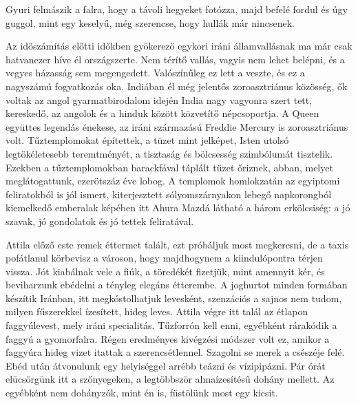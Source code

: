 
Gyuri felmászik a falra, hogy a távoli hegyeket fotózza, majd befelé
fordul és úgy guggol, mint egy keselyű, még szerencse, hogy hullák
már nincsenek.

Az időszámítás előtti időkben gyökerező egykori iráni államvallásnak
ma már csak hatvanezer híve él országszerte. Nem térítő vallás,
vagyis nem lehet belépni, és a vegyes házasság sem megengedett. Valószínűleg
ez lett a veszte, és ez a nagyszámú fogyatkozás oka. Indiában
él még jelentős zoroasztriánus közösség, ők voltak az angol gyarmatbirodalom
idején India nagy vagyonra szert tett, kereskedő, az angolok
és a hinduk között közvetítő népcsoportja. A Queen együttes legendás
énekese, az iráni származású Freddie Mercury is zoroasztriánus
volt. Tűztemplomokat építettek, a tüzet mint jelképet, Isten utolsó
legtökéletesebb teremtményét, a tisztaság és bölcsesség szimbólumát
tisztelik. Ezekben a tűztemplomokban barackfával táplált tüzet őriznek,
abban, melyet meglátogattunk, ezerötszáz éve lobog. A templomok
homlokzatán az egyiptomi feliratokból is jól ismert, kiterjesztett
sólyomszárnyakon lebegő napkorongból kiemelkedő emberalak képében
itt Ahura Mazdá látható a három erkölcsiség: a jó szavak, jó gondolatok
és jó tettek feliratával.

Attila előző este remek éttermet talált, ezt próbáljuk most megkeresni,
de a taxis pofátlanul körbevisz a városon, hogy majdhogynem
a kiindulópontra térjen vissza. Jót kiabálnak vele a fiúk, a töredékét
fizetjük, mint amennyit kér, és beviharzunk ebédelni a tényleg elegáns
étterembe. A joghurtot minden formában készítik Iránban, itt megkóstolhatjuk
levesként, szenzációs a sajnos nem tudom, milyen fűszerekkel
ízesített, hideg leves. Attila végre itt talál az étlapon faggyúlevest,
mely iráni specialitás. Tűzforrón kell enni, egyébként rárakódik
a faggyú a gyomorfalra. Régen eredményes kivégzési módszer volt ez,
amikor a faggyúra hideg vizet itattak a szerencsétlennel. Szagolni se
merek a csészéje felé. Ebéd után átvonulunk egy helyiséggel arrébb
teázni és vízipipázni. Pár órát elücsörgünk itt a szőnyegeken, a legtöbbször
almaízesítésű dohány mellett. Az egyébként nem dohányzók,
mint én is, füstölünk most egy kicsit.

